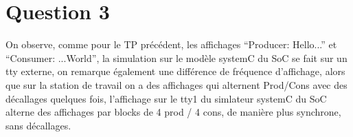 \documentclass[12pt]{article}
\begin{document}
\section*{Question 3}
On observe, comme pour le TP précédent, les affichages ``Producer: Hello...'' et ``Consumer: ...World'', la simulation sur le modèle systemC du SoC se fait sur un tty externe, on remarque également une différence de fréquence d'affichage, alors que sur la station de travail on a des affichages qui alternent Prod/Cons avec des décallages quelques fois, l'affichage sur le tty1 du simlateur systemC du SoC alterne des affichages par blocks de 4 prod / 4 cons, de manière plus synchrone, sans décallages.
\end{document}
